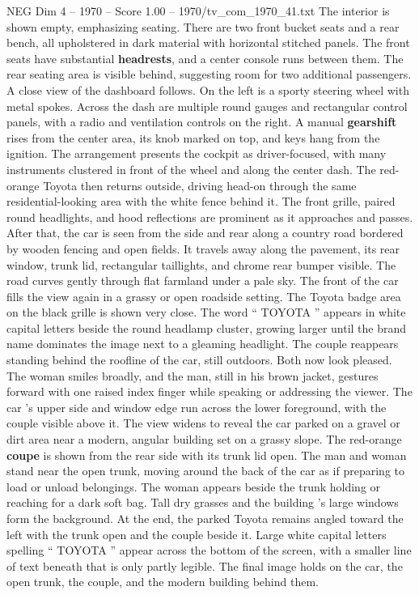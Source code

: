 \begin{textsample}{NEG Dim 4 – 1970 – Score 1.00 – 1970/tv\_com\_1970\_41.txt}
The interior is shown empty, emphasizing seating.
There are two front bucket seats and a rear bench, all upholstered in dark material with horizontal stitched panels.
The front seats have substantial \textbf{headrests}, and a center console runs between them.
The rear seating area is visible behind, suggesting room for two additional passengers.
A close view of the dashboard follows.
On the left is a sporty steering wheel with metal spokes.
Across the dash are multiple round gauges and rectangular control panels, with a radio and ventilation controls on the right.
A manual \textbf{gearshift} rises from the center area, its knob marked on top, and keys hang from the ignition.
The arrangement presents the cockpit as driver-focused, with many instruments clustered in front of the wheel and along the center dash.
The red-orange Toyota then returns outside, driving head-on through the same residential-looking area with the white fence behind it.
The front grille, paired round headlights, and hood reflections are prominent as it approaches and passes.
After that, the car is seen from the side and rear along a country road bordered by wooden fencing and open fields.
It travels away along the pavement, its rear window, trunk lid, rectangular taillights, and chrome rear bumper visible.
The road curves gently through flat farmland under a pale sky.
The front of the car fills the view again in a grassy or open roadside setting.
The Toyota badge area on the black grille is shown very close.
The word “ TOYOTA ” appears in white capital letters beside the round headlamp cluster, growing larger until the brand name dominates the image next to a gleaming headlight.
The couple reappears standing behind the roofline of the car, still outdoors.
Both now look pleased.
The woman smiles broadly, and the man, still in his brown jacket, gestures forward with one raised index finger while speaking or addressing the viewer.
The car ’s upper side and window edge run across the lower foreground, with the couple visible above it.
The view widens to reveal the car parked on a gravel or dirt area near a modern, angular building set on a grassy slope.
The red-orange \textbf{coupe} is shown from the rear side with its trunk lid open.
The man and woman stand near the open trunk, moving around the back of the car as if preparing to load or unload belongings.
The woman appears beside the trunk holding or reaching for a dark soft bag.
Tall dry grasses and the building ’s large windows form the background.
At the end, the parked Toyota remains angled toward the left with the trunk open and the couple beside it.
Large white capital letters spelling “ TOYOTA ” appear across the bottom of the screen, with a smaller line of text beneath that is only partly legible.
The final image holds on the car, the open trunk, the couple, and the modern building behind them.

\end{textsample}
